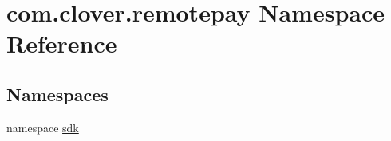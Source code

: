 \hypertarget{namespacecom_1_1clover_1_1remotepay}{}\section{com.\+clover.\+remotepay Namespace Reference}
\label{namespacecom_1_1clover_1_1remotepay}
\subsection*{Namespaces}
\begin{DoxyCompactItemize}
\item 
namespace \hyperlink{namespacecom_1_1clover_1_1remotepay_1_1sdk}{sdk}
\end{DoxyCompactItemize}
